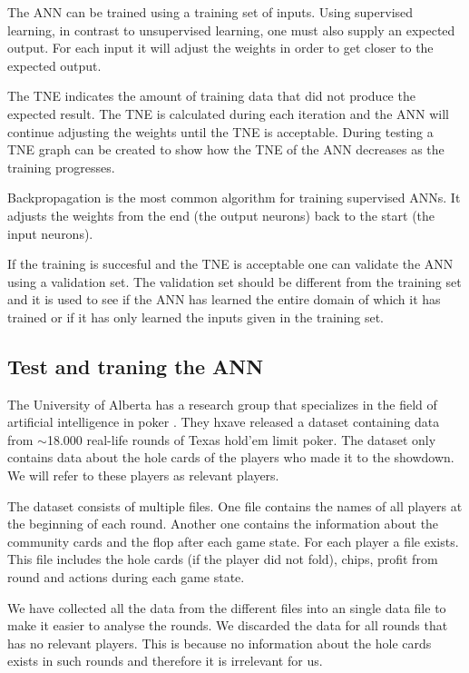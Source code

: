 
\vspace{4mm}


The ANN can be trained using a training set of inputs. Using supervised learning, in contrast to unsupervised learning, one must also supply an expected output. For each input it will adjust the weights in order to get closer to the expected output. 

The TNE indicates the amount of training data that did not produce the expected result. The TNE is calculated during each iteration and the ANN will continue adjusting the weights until the TNE is acceptable. During testing a TNE graph can be created to show how the TNE of the ANN decreases as the training progresses.  

Backpropagation is the most common algorithm for training supervised ANNs. It adjusts the weights from the end (the output neurons) back to the start (the input neurons).

If the training is succesful and the TNE is acceptable one can validate the ANN using a validation set. The validation set should be different from the training set and it is used to see if the ANN has learned the entire domain of which it has trained or if it has only learned the inputs given in the training set.

\subsection{Test and traning the ANN}
\label{sec:default-test}
The University of Alberta has a research group that specializes in the field of artificial intelligence in poker \cite{alberta}. They hxave released a dataset containing data from $\sim$18.000 real-life rounds of Texas hold'em limit poker. The dataset only contains data about the hole cards of the players who made it to the showdown. We will refer to these players as relevant players.

The dataset consists of multiple files. One file contains the names of all players at the beginning of each round. Another one contains the information about the community cards and the flop after each game state. For each player a file exists. This file includes the hole cards (if the player did not fold), chips, profit from round and actions during each game state. 

We have collected all the data from the different files into an single data file to make it easier to analyse the rounds. We discarded the data for all rounds that has no relevant players. This is because no information about the hole cards exists in such rounds and therefore it is irrelevant for us. 

